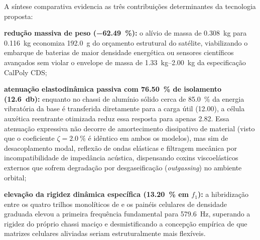 A síntese comparativa evidencia as três contribuições determinantes da tecnologia proposta:
\begin{alineas}
  \item \textbf{redução massiva de peso (\SI{-62.49}{\percent}):} o alívio de massa de \SI{0.308}{\kilo\gram} para \SI{0.116}{\kilo\gram} economiza \SI{192.0}{\gram} do orçamento estrutural do satélite, viabilizando o embarque de baterias de maior densidade energética ou sensores científicos avançados sem violar o envelope de massa de \SIrange{1.33}{2.00}{\kilo\gram} da especificação CalPoly CDS;
  \item \textbf{atenuação elastodinâmica passiva com \SI{76.50}{\percent} de isolamento (\SI{12.6}{\decibel}):} enquanto no chassi de alumínio sólido cerca de \SI{85.0}{\percent} da energia vibratória da base é transferida diretamente para a carga útil (\SI{12.00}{\Grms}), a célula auxética reentrante otimizada reduz essa resposta para apenas \SI{2.82}{\Grms}. Essa atenuação expressiva não decorre de amortecimento dissipativo de material (visto que o coeficiente $\zeta = \SI{2.0}{\percent}$ é idêntico em ambos os modelos), mas sim de desacoplamento modal, reflexão de ondas elásticas e filtragem mecânica por incompatibilidade de impedância acústica, dispensando coxins viscoelásticos externos que sofrem degradação por desgaseificação (\textit{outgassing}) no ambiente orbital;
  \item \textbf{elevação da rigidez dinâmica específica (\SI{+13.20}{\percent} em $f_1$):} a hibridização entre os quatro trilhos monolíticos de \rail{} e os painéis celulares de densidade graduada elevou a primeira frequência fundamental para \SI{579.6}{\hertz}, superando a rigidez do próprio chassi maciço e desmistificando a concepção empírica de que matrizes celulares aliviadas seriam estruturalmente mais flexíveis.
\end{alineas}

